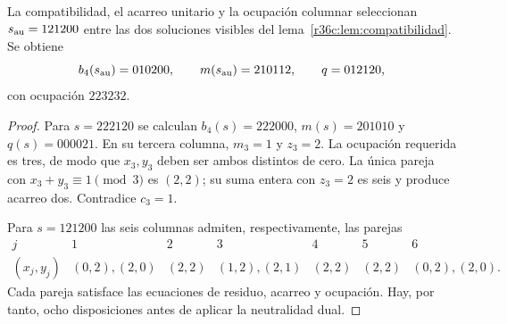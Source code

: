\begin{proposition}
La compatibilidad, el acarreo unitario y la ocupación columnar seleccionan
$s_{\rm au}=121200$ entre las dos soluciones visibles del
lema~\ref{r36c:lem:compatibilidad}. Se obtiene
\[
b_4(s_{\rm au})=010200,\qquad
m(s_{\rm au})=210112,\qquad q=012120,
\]
con ocupación $223232$.
\end{proposition}
\begin{proof}
Para $s=222120$ se calculan
$b_4(s)=222000$, $m(s)=201010$ y $q(s)=000021$.
En su tercera columna, $m_3=1$ y $z_3=2$. La ocupación requerida es tres,
de modo que $x_3,y_3$ deben ser ambos distintos de cero. La única pareja
con $x_3+y_3\equiv1\pmod3$ es $(2,2)$; su suma entera con $z_3=2$ es
seis y produce acarreo dos. Contradice $c_3=1$.

Para $s=121200$ las seis columnas admiten, respectivamente, las parejas
\[
\begin{array}{c|cccccc}
j&1&2&3&4&5&6\\\hline
(x_j,y_j)&(0,2),(2,0)&(2,2)&(1,2),(2,1)&(2,2)&(2,2)&(0,2),(2,0).
\end{array}
\]
Cada pareja satisface las ecuaciones de residuo, acarreo y ocupación.
Hay, por tanto, ocho disposiciones antes de aplicar la neutralidad dual.
\end{proof}

